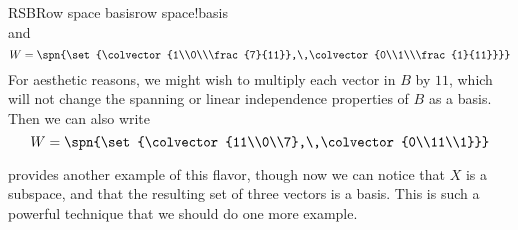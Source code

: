 \begin{example}{RSB}{Row space basis}{row space!basis}
\begin{equation*}
\end{equation*}
%
and
%
\begin{equation*}
W=\spn{\set{\colvector{1\\0\\\frac{7}{11}},\,\colvector{0\\1\\\frac{1}{11}}}}
\end{equation*}
%
For aesthetic reasons, we might wish to multiply each vector in $B$ by $11$, which will not change the spanning or linear independence properties of $B$ as a basis.  Then we can also write
%
\begin{equation*}
W=\spn{\set{\colvector{11\\0\\7},\,\colvector{0\\11\\1}}}
\end{equation*}
%
\end{example}
%
 provides another example of this flavor, though now we can notice that $X$ is a subspace, and that the resulting set of three vectors is a basis.  This is such a powerful technique that we should do one more example.
%
